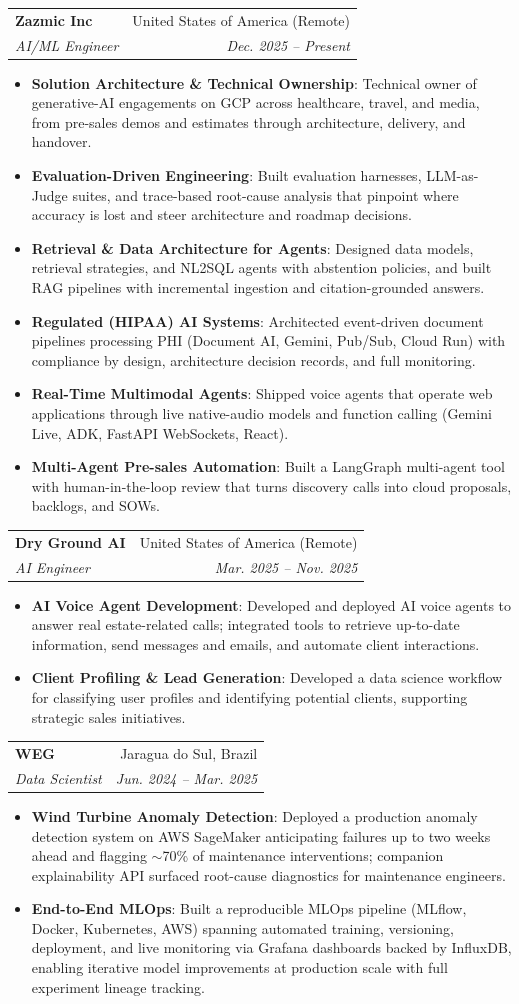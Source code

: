 \documentclass[letterpaper,11pt]{article}
\makeatletter
\newcommand{\resumeItem}[2]{
  \item\small{
    \textbf{#1}{: #2 \vspace{-2pt}}
  }
}
\newcommand{\resumeSubheading}[4]{
  \needspace{6\baselineskip}
  \vspace {-1pt}\item
    \begin{tabular*}{0.97\textwidth}{l@{\extracolsep{\fill}}r}
      \textbf{#1} & #2\\
      \textit{\small#3} & \textit{\small #4} \\
    \end{tabular*}\vspace{-5pt}
}
\newcommand{\resumeItemListStart}{\begin{itemize} }
\newcommand{\resumeItemListEnd}{\end{itemize}\vspace{-5pt}}
\makeatother
\begin{document}
\resumeSubheading
{Zazmic Inc}{United States of America (Remote)}
{AI/ML Engineer}{Dec. 2025 -- Present}
\resumeItemListStart
\resumeItem{Solution Architecture \& Technical Ownership}{Technical owner of generative-AI engagements on GCP across healthcare, travel, and media, from pre-sales demos and estimates through architecture, delivery, and handover.}
\resumeItem{Evaluation-Driven Engineering}{Built evaluation harnesses, LLM-as-Judge suites, and trace-based root-cause analysis that pinpoint where accuracy is lost and steer architecture and roadmap decisions.}
\resumeItem{Retrieval \& Data Architecture for Agents}{Designed data models, retrieval strategies, and NL2SQL agents with abstention policies, and built RAG pipelines with incremental ingestion and citation-grounded answers.}
\resumeItem{Regulated (HIPAA) AI Systems}{Architected event-driven document pipelines processing PHI (Document AI, Gemini, Pub/Sub, Cloud Run) with compliance by design, architecture decision records, and full monitoring.}
\resumeItem{Real-Time Multimodal Agents}{Shipped voice agents that operate web applications through live native-audio models and function calling (Gemini Live, ADK, FastAPI WebSockets, React).}
\resumeItem{Multi-Agent Pre-sales Automation}{Built a LangGraph multi-agent tool with human-in-the-loop review that turns discovery calls into cloud proposals, backlogs, and SOWs.}
\resumeItemListEnd


\resumeSubheading
{Dry Ground AI}{United States of America (Remote)}
{AI Engineer}{Mar. 2025 -- Nov. 2025}
\resumeItemListStart
\resumeItem{AI Voice Agent Development}{Developed and deployed AI voice agents to answer real estate-related calls; integrated tools to retrieve up-to-date information, send messages and emails, and automate client interactions.}
\resumeItem{Client Profiling \& Lead Generation}{Developed a data science workflow for classifying user profiles and identifying potential clients, supporting strategic sales initiatives.}
\resumeItemListEnd


\resumeSubheading
{WEG}{Jaragua do Sul, Brazil}
{Data Scientist}{Jun. 2024 -- Mar. 2025}
\resumeItemListStart
\resumeItem{Wind Turbine Anomaly Detection}
{Deployed a production anomaly detection system on AWS SageMaker anticipating failures up to two weeks ahead and flagging $\sim$70\% of maintenance interventions; companion explainability API surfaced root-cause diagnostics for maintenance engineers.}
\resumeItem{End-to-End MLOps}
{Built a reproducible MLOps pipeline (MLflow, Docker, Kubernetes, AWS) spanning automated training, versioning, deployment, and live monitoring via Grafana dashboards backed by InfluxDB, enabling iterative model improvements at production scale with full experiment lineage tracking.}
\resumeItemListEnd
\end{document}
